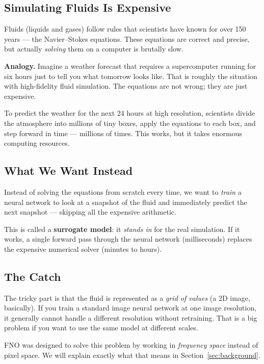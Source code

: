 \documentclass[acmsmall,nonacm]{acmart}
\begin{document}
\subsection{Simulating Fluids Is Expensive}

Fluids (liquids and gases) follow rules that scientists have known for over 150
years --- the Navier--Stokes equations.
These equations are correct and precise, but actually \emph{solving} them
on a computer is brutally slow.

\begin{analogybox}
\textbf{Analogy.}
Imagine a weather forecast that requires a supercomputer running for six hours
just to tell you what tomorrow looks like.
That is roughly the situation with high-fidelity fluid simulation.
The equations are not wrong; they are just expensive.
\end{analogybox}

To predict the weather for the next 24 hours at high resolution, scientists
divide the atmosphere into millions of tiny boxes, apply the equations to each
box, and step forward in time --- millions of times.
This works, but it takes enormous computing resources.

\subsection{What We Want Instead}

Instead of solving the equations from scratch every time, we want to
\emph{train} a neural network to look at a snapshot of the fluid and
immediately predict the next snapshot --- skipping all the expensive arithmetic.

This is called a \textbf{surrogate model}: it \emph{stands in} for the real
simulation.
If it works, a single forward pass through the neural network (milliseconds)
replaces the expensive numerical solver (minutes to hours).

\subsection{The Catch}

The tricky part is that the fluid is represented as a \emph{grid of values}
(a 2D image, basically).
If you train a standard image neural network at one image resolution, it
generally cannot handle a different resolution without retraining.
That is a big problem if you want to use the same model at different scales.

FNO was designed to solve this problem by working in \emph{frequency space}
instead of pixel space.
We will explain exactly what that means in Section~\ref{sec:background}.
\end{document}
